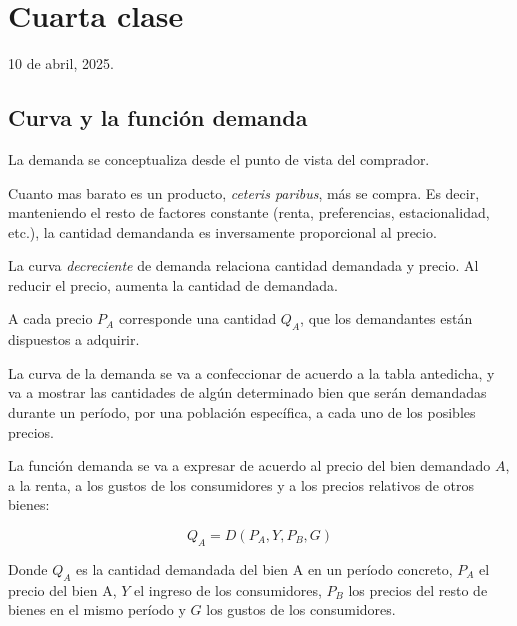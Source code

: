 \section{Cuarta clase}

10 de abril, 2025.

\subsection{Curva y la función demanda}

La demanda se conceptualiza desde el punto de vista del comprador.

Cuanto mas barato es un producto, \textit{ceteris paribus}, más se compra.
Es decir,
manteniendo el resto de factores constante (renta, preferencias, estacionalidad, etc.),
la cantidad demandanda es inversamente proporcional al precio.

La curva \textit{decreciente} de demanda relaciona cantidad demandada y precio.
Al reducir el precio,
aumenta la cantidad de demandada.

A cada precio \(P_A\) corresponde una cantidad \(Q_A\),
que los demandantes están dispuestos a adquirir.

La curva de la demanda se va a confeccionar de acuerdo a la tabla antedicha,
y va a mostrar las cantidades de algún determinado bien que serán demandadas durante un período,
por una población específica, a cada uno de los posibles precios.

La función demanda se va a expresar de acuerdo al precio del bien demandado \(A\),
a la renta, a los gustos de los consumidores y a los precios relativos de otros bienes:

\begin{equation*}
    Q_A = D(P_A, Y, P_B, G)
\end{equation*}

Donde \(Q_A\) es la cantidad demandada del bien A en un período concreto,
\(P_A\) el precio del bien A,
\(Y\) el ingreso de los consumidores,
\(P_B\) los precios del resto de bienes en el mismo período
y \(G\) los gustos de los consumidores.

\begin{center}
\end{center}

